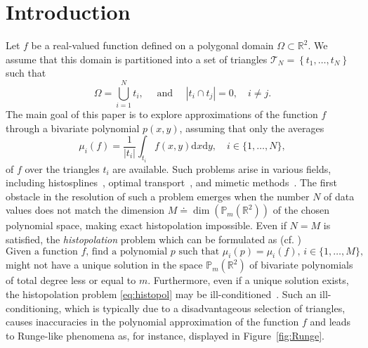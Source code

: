 \documentclass{svjour3}
\newcommand{\R}{\mathbb{R}} %
\newcommand{\de}{\mathrm{d}}
\renewcommand{\P}{\mathbb{P}} %
\renewcommand{\de}{\mathrm{d}} %
\begin{document}
\section{Introduction}

Let $f$ be a real-valued function defined on a polygonal domain $\Omega \subset \R^2$. We assume that this domain is partitioned into a set of triangles $ \mathcal{T}_N=\left\{t_1, \ldots, t_N \right\} $ 
such that
\begin{equation*} \Omega = \bigcup_{i=1}^N t_i, \quad \text{ and } \quad   \left\lvert t_i \cap t_j \right\rvert = 0, \quad i\neq j. 
\end{equation*}
The main goal of this paper is to explore approximations of the function $f$ through a bivariate polynomial $p(x,y)$, assuming that only the averages
\begin{equation} \label{eq:mui} \mu_i(f) = \frac{1}{|t_i|}\int_{t_i} f(x,y) \de x \de y , \quad i \in \{ 1, \ldots, N\},
\end{equation}
of $f$ over the triangles $t_i$ are available. Such problems arise in various fields, including histosplines~\cite{Schoenberg}, optimal transport~\cite{OptimalTransport}, and mimetic methods~\cite{BeiraoMimetic}. 
The first obstacle in the resolution of such a problem emerges when the number $N$ of data values does not match the dimension $ M \doteq \operatorname{dim} \left(\P_m\left(\mathbb{R}^2\right)\right)$ of the chosen polynomial space, making exact histopolation impossible. %
Even if $N = M$ is satisfied, the 
\emph{histopolation} problem which can be formulated as (cf. \cite{Robidoux})
\begin{equation} \label{eq:histopol} \text{Given a function $f$, find a polynomial $p$ such that $\mu_i(p) = \mu_i(f)$, $i \in \{ 1,\dots,M\}$,} \end{equation}
might not have a unique solution in the space $\P_m \left(\mathbb{R}^2\right)$ of bivariate polynomials of total degree less or equal to $m$. Furthermore, even if a unique solution exists, the histopolation problem \eqref{eq:histopol} may be ill-conditioned~\cite{RothThesis}. Such an ill-conditioning, which is typically due to a disadvantageous selection of triangles, causes inaccuracies in the polynomial approximation of the function $f$ and leads to Runge-like phenomena as, for instance, displayed in Figure~\ref{fig:Runge}. 
\end{document}
